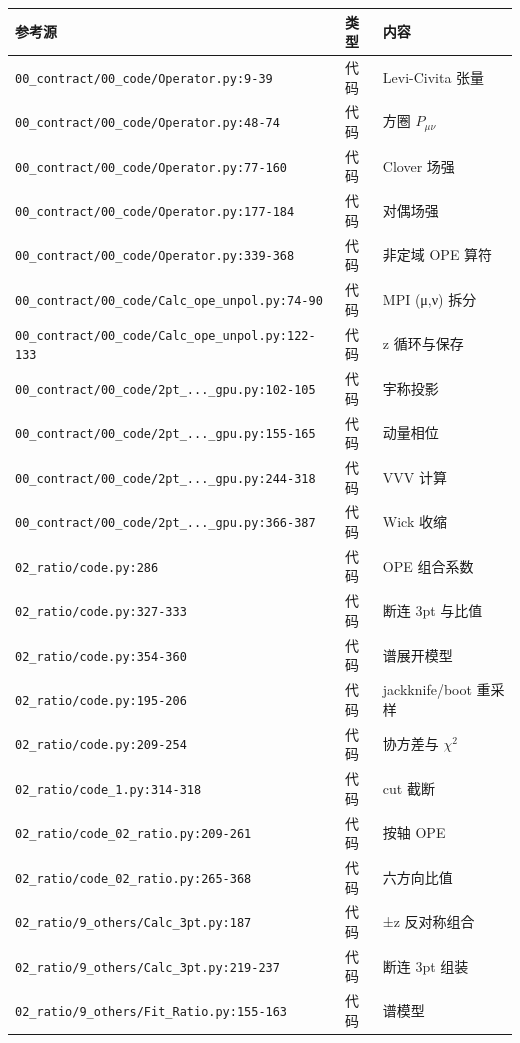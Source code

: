\documentclass[UTF8]{ctexart}
\begin{document}
\begin{table}[h]
\centering\small
\begin{tabular}{llp{7.5cm}}
\toprule
参考源 & 类型 & 内容 \\
\midrule
\texttt{00\_contract/00\_code/Operator.py:9-39} & 代码 & Levi-Civita 张量 \\
\texttt{00\_contract/00\_code/Operator.py:48-74} & 代码 & 方圈 $P_{\mu\nu}$ \\
\texttt{00\_contract/00\_code/Operator.py:77-160} & 代码 & Clover 场强 \\
\texttt{00\_contract/00\_code/Operator.py:177-184} & 代码 & 对偶场强 \\
\texttt{00\_contract/00\_code/Operator.py:339-368} & 代码 & 非定域 OPE 算符 \\
\texttt{00\_contract/00\_code/Calc\_ope\_unpol.py:74-90} & 代码 & MPI (μ,ν) 拆分 \\
\texttt{00\_contract/00\_code/Calc\_ope\_unpol.py:122-133} & 代码 & z 循环与保存 \\
\texttt{00\_contract/00\_code/2pt\_...\_gpu.py:102-105} & 代码 & 宇称投影 \\
\texttt{00\_contract/00\_code/2pt\_...\_gpu.py:155-165} & 代码 & 动量相位 \\
\texttt{00\_contract/00\_code/2pt\_...\_gpu.py:244-318} & 代码 & VVV 计算 \\
\texttt{00\_contract/00\_code/2pt\_...\_gpu.py:366-387} & 代码 & Wick 收缩 \\
\texttt{02\_ratio/code.py:286} & 代码 & OPE 组合系数 \\
\texttt{02\_ratio/code.py:327-333} & 代码 & 断连 3pt 与比值 \\
\texttt{02\_ratio/code.py:354-360} & 代码 & 谱展开模型 \\
\texttt{02\_ratio/code.py:195-206} & 代码 & jackknife/boot 重采样 \\
\texttt{02\_ratio/code.py:209-254} & 代码 & 协方差与 $\chi^2$ \\
\texttt{02\_ratio/code\_1.py:314-318} & 代码 & cut 截断 \\
\texttt{02\_ratio/code\_02\_ratio.py:209-261} & 代码 & 按轴 OPE \\
\texttt{02\_ratio/code\_02\_ratio.py:265-368} & 代码 & 六方向比值 \\
\texttt{02\_ratio/9\_others/Calc\_3pt.py:187} & 代码 & ±z 反对称组合 \\
\texttt{02\_ratio/9\_others/Calc\_3pt.py:219-237} & 代码 & 断连 3pt 组装 \\
\texttt{02\_ratio/9\_others/Fit\_Ratio.py:155-163} & 代码 & 谱模型 \\

\end{tabular}
\end{table}
\end{document}
